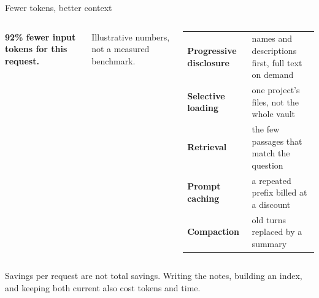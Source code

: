 \begin{frame}{Fewer tokens, better context}
  \begin{columns}[T,onlytextwidth]
      \vspace{0.45em}
      {\small\bfseries\color{ink} 92\% fewer input tokens for this request.\par}
      \vspace{0.2em}
      {\scriptsize\color{muted} Illustrative numbers, not a measured benchmark.\par}
      \renewcommand{\arraystretch}{1.2}
      {\small
      \begin{tabularx}{\linewidth}{>{\bfseries\color{ink}}l >{\leavevmode\color{dark}}X}
      Progressive disclosure & names and descriptions first, full text on demand\\
      Selective loading & one project's files, not the whole vault\\
      Retrieval & the few passages that match the question\\
      Prompt caching & a repeated prefix billed at a discount\\
      Compaction & old turns replaced by a summary\\
      \end{tabularx}\par}
  \end{columns}
  \vspace{0.45em}
  {\small Savings per request are not total savings. Writing the notes, building an index, and keeping both current also cost tokens and time.\par}
\end{frame}

